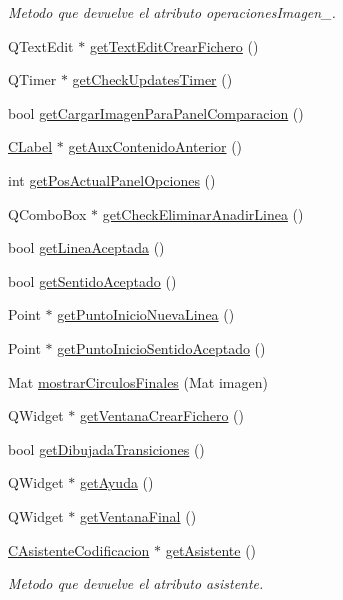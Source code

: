 \begin{DoxyCompactItemize}
\begin{DoxyCompactList}\small\item\em Metodo que devuelve el atributo operaciones\+Imagen\+\_\+. \end{DoxyCompactList}\item 
Q\+Text\+Edit $\ast$ \hyperlink{classCAplicacion_adcfc47c237cfbf71ac8d31fde5da7547}{get\+Text\+Edit\+Crear\+Fichero} ()
\item 
Q\+Timer $\ast$ \hyperlink{classCAplicacion_a63fe50bc3b56256d45b26a2baa11282d}{get\+Check\+Updates\+Timer} ()
\item 
bool \hyperlink{classCAplicacion_ad925c2a3914118389e1e49a489684691}{get\+Cargar\+Imagen\+Para\+Panel\+Comparacion} ()
\item 
\hyperlink{classCLabel}{C\+Label} $\ast$ \hyperlink{classCAplicacion_a5cc3dc6dfabfa61ea47ffa4fd5a60da3}{get\+Aux\+Contenido\+Anterior} ()
\item 
int \hyperlink{classCAplicacion_a004a97b1615e60204fc26ca75460a46c}{get\+Pos\+Actual\+Panel\+Opciones} ()
\item 
Q\+Combo\+Box $\ast$ \hyperlink{classCAplicacion_ad598b5ee761e9d37b7129ba09489c5c9}{get\+Check\+Eliminar\+Anadir\+Linea} ()
\item 
bool \hyperlink{classCAplicacion_a2570b292f648e2606b4751e7287b861f}{get\+Linea\+Aceptada} ()
\item 
bool \hyperlink{classCAplicacion_a814e4c79b1e1a5901ecb3eec0963512e}{get\+Sentido\+Aceptado} ()
\item 
Point $\ast$ \hyperlink{classCAplicacion_a72ca0e084a295791e7805547b3c64f27}{get\+Punto\+Inicio\+Nueva\+Linea} ()
\item 
Point $\ast$ \hyperlink{classCAplicacion_a9268df882ced8fcc86a4265870193d6f}{get\+Punto\+Inicio\+Sentido\+Aceptado} ()
\item 
Mat \hyperlink{classCAplicacion_a4fa8050faf5ddf0f6622a0448c1ea52b}{mostrar\+Circulos\+Finales} (Mat imagen)
\item 
Q\+Widget $\ast$ \hyperlink{classCAplicacion_a9b4ab02422a45e18628950a2506d4c22}{get\+Ventana\+Crear\+Fichero} ()
\item 
bool \hyperlink{classCAplicacion_afa9ff1b6e4929b0fa9b777f954f3c7d7}{get\+Dibujada\+Transiciones} ()
\item 
Q\+Widget $\ast$ \hyperlink{classCAplicacion_ab611a7dd679f4cde9f8a9fff71e38894}{get\+Ayuda} ()
\item 
Q\+Widget $\ast$ \hyperlink{classCAplicacion_ad16f51702a617270340ba7f46179af5a}{get\+Ventana\+Final} ()
\item 
\hyperlink{classCAsistenteCodificacion}{C\+Asistente\+Codificacion} $\ast$ \hyperlink{classCAplicacion_aaf37bae3bb8464c4dab0c0a425f7185b}{get\+Asistente} ()
\begin{DoxyCompactList}\small\item\em Metodo que devuelve el atributo asistente. \end{DoxyCompactList}\end{DoxyCompactItemize}
